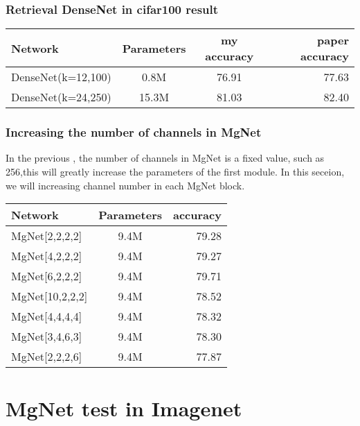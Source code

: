 \subsubsection{Retrieval DenseNet in cifar100 result}
\begin{tabular}{| l   | c | c  | r |}
	\hline
	Network                  &     Parameters   &       my accuracy  & paper accuracy   \\
	\hline
	DenseNet(k=12,100)       &     0.8M         &       76.91        & 77.63 \\
	\hline
	DenseNet(k=24,250)       &     15.3M         &      81.03        & 82.40 \\
	\hline
\end{tabular}

\subsubsection{Increasing the number of channels in MgNet }
In the previous , the number of channels in MgNet is a fixed value, such as 256,this will greatly increase the parameters of the first module. In this seceion, we will increasing channel number in each MgNet block.\\
\vbox{}
\begin{tabular}{| l | c | r |}
	\hline
	Network                  &     Parameters   &       accuracy   \\
	\hline
	MgNet[2,2,2,2]           &      9.4M        &      79.28  \\
	\hline
	MgNet[4,2,2,2]           &      9.4M        &      79.27  \\
	\hline
	MgNet[6,2,2,2]           &      9.4M        &      79.71  \\
	\hline
	MgNet[10,2,2,2]          &      9.4M        &      78.52  \\
	\hline
	MgNet[4,4,4,4]           &      9.4M        &      78.32  \\
	\hline
	MgNet[3,4,6,3]           &      9.4M        &      78.30  \\
	\hline
	MgNet[2,2,2,6]           &      9.4M        &      77.87  \\
	\hline
\end{tabular}

\newpage
\section{MgNet test in Imagenet}

